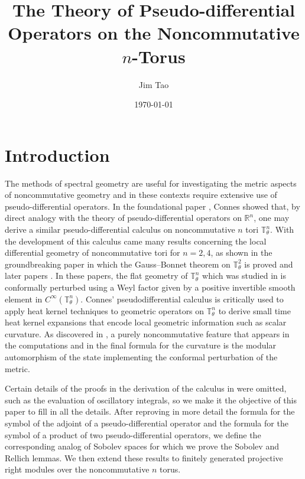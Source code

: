 \documentclass[10pt]{article}
\title{The Theory of Pseudo-differential Operators
on the Noncommutative $n$-Torus}
\author{Jim Tao}
\date{\today}
\theoremstyle{remark}
\theoremstyle{definition}
\begin{document}
\maketitle

\section{Introduction}
The methods of spectral geometry are useful for investigating
the metric aspects of noncommutative geometry
\cite{ncdg,ncg,cmindex,ncgqfm} and in these contexts require extensive use
of pseudo-differential operators. In the foundational paper \cite{ccstar},
Connes showed that, by direct analogy with the theory
\cite{gilkey,raymond,wong} of pseudo-differential operators on $\mathbb R^n$,
one may derive a similar pseudo-differential calculus on noncommutative $n$
tori $\mathbb T_{\theta}^n$. With the development of this calculus
came many results concerning the local differential geometry of noncommutative
tori for $n=2,4$, as shown in the groundbreaking paper \cite{ct}
in which the Gauss--Bonnet theorem on $\mathbb T_{\theta}^2$ is proved
and later papers \cite{cmcurvature,fkgb,fk2t,fk4t,fkwc}.
In these papers, the flat geometry of $\mathbb T_{\theta}^n$ which was studied
in \cite{ccstar} is conformally perturbed using a Weyl factor given
by a positive invertible smooth element in $C^{\infty}(\mathbb T_{\theta}^n)$.
Connes' pseudodifferential calculus is critically used to apply heat
kernel techniques to geometric operators on $\mathbb T_{\theta}^n$ to
derive small time heat kernel expansions that encode local geometric
information such as scalar curvature. As discovered in
\cite{cmcurvature, fk2t, fk4t}, a purely noncommutative feature that
appears in the computations and in the final formula for the curvature
is the modular automorphism of the state implementing the conformal
perturbation of the metric.

Certain details of the proofs in the derivation of the calculus in
\cite{ccstar} were omitted, such as the evaluation of oscillatory integrals,
so we make it the objective of this paper to fill in all the details. After
reproving in more detail the formula for the symbol of the adjoint of a
pseudo-differential operator and the formula for the symbol of a product of
two pseudo-differential operators, we define the corresponding analog of
Sobolev spaces for which we prove the Sobolev and Rellich lemmas. We then
extend these results to finitely generated projective right modules over the
noncommutative $n$ torus.
\end{document}
